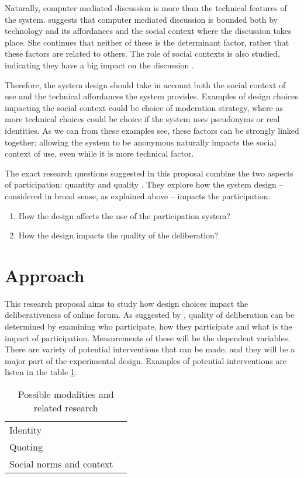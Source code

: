 \documentclass[journal,a4paper]{IEEEtran}
\begin{document}
Naturally, computer mediated discussion is more than the technical features of the system.  suggests that computer mediated discussion is bounded both by technology and its affordances and the social context where the discussion takes place. She continues that neither of these is the determinant factor, rather that these factors are related to others. The role of social contexts is also studied, indicating they have a big impact on the discussion \cite{sukumaran11,underhill03}.

Therefore, the system design should take in account both the social context of use and the technical affordances the system provides. Examples of design choices impacting the social context could be choice of moderation strategy, where as more technical choices could be choice if the system uses pseudonyms or real identities. As we can from these examples see, these factors can be strongly linked together: allowing the system to be anonymous naturally impacts the social context of use, even while it is more technical factor.

The exact research questions suggested in this proposal combine the two aspects of participation: quantity and quality . They explore how the system design -- considered in broad sense, as explained above -- impacts the participation.

\begin{enumerate}
\item How the design affects the use of the participation system?
\item How the design impacts the quality of the deliberation?
\end{enumerate}

\section{Approach}
This research proposal aims to study how design choices impact the deliberativeness of online forum. As suggested by , quality of deliberation can be determined by examining who participate, how they participate and what is the impact of participation. Measurements of these will be the dependent variables. There are variety of potential interventions that can be made, and they will be a major part of the experimental design. Examples of potential interventions are listen in the table \ref{tab:modalities}.

\begin{table}
\caption{Possible modalities and related research}
\begin{tabular}{ll}
Identity & \cite{danet98,donath99}  \\ 
Quoting & \cite{eklundh94} \\ 
Social norms and context & \cite{sukumaran11,underhill03} \\
\end{tabular} 
\label{tab:modalities}
\end{table}
\end{document}
